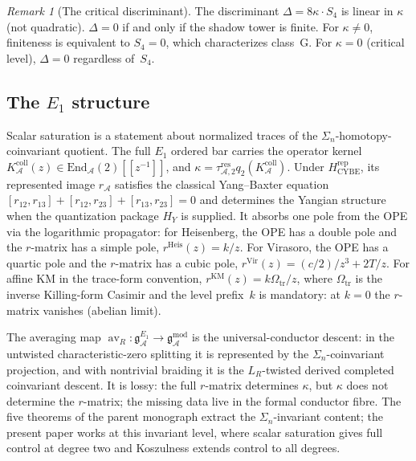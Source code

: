 \documentclass[11pt,reqno]{amsart}
\theoremstyle{definition}
\theoremstyle{remark}
\newtheorem{remark}[theorem]{Remark}
\newcommand{\cA}{\mathcal{A}}
\newcommand{\fg}{\mathfrak{g}}
\newcommand{\Vir}{\mathrm{Vir}}
\newcommand{\KM}{\mathrm{KM}}
\newcommand{\Heis}{\mathrm{Heis}}
\newcommand{\Eone}{E_1}
\DeclareMathOperator{\av}{av}
\numberwithin{equation}{section}
\begin{document}
\begin{remark}[The critical discriminant]
\label{rem:kfc-discriminant}
The discriminant $\Delta = 8\kappa \cdot S_4$ is linear in
$\kappa$ (not quadratic). $\Delta = 0$ if and only if the shadow
tower is finite. For $\kappa \neq 0$, finiteness is equivalent to
$S_4 = 0$, which characterizes class~G. For $\kappa = 0$ (critical
level), $\Delta = 0$ regardless of~$S_4$.
\end{remark}

\subsection{The $\Eone$ structure}

Scalar saturation is a statement about normalized traces of the
$\Sigma_n$-homotopy-coinvariant quotient. The full $\Eone$ ordered
bar carries the operator kernel
$K_\cA^{\mathrm{coll}}(z)\in\mathrm{End}_\cA(2)[\![z^{-1}]\!]$,
and $\kappa=\tau_{\cA,2}^{\mathrm{res}}
q_2(K_\cA^{\mathrm{coll}})$. Under
$H_{\mathrm{CYBE}}^{\mathrm{rep}}$, its represented image $r_\cA$
satisfies the classical Yang--Baxter equation
$[r_{12}, r_{13}] + [r_{12}, r_{23}] + [r_{13}, r_{23}] = 0$
and determines the Yangian structure when the quantization package
$H_Y$ is supplied.
It absorbs one pole from the OPE via the logarithmic propagator:
for Heisenberg, the OPE has a double pole and the $r$-matrix
has a simple pole, $r^{\Heis}(z) = k/z$. For Virasoro, the OPE has
a quartic pole and the $r$-matrix has a cubic pole,
$r^{\Vir}(z) = (c/2)/z^3 + 2T/z$.
For affine KM in the trace-form convention,
$r^{\KM}(z) = k\Omega_{\mathrm{tr}}/z$, where
$\Omega_{\mathrm{tr}}$ is the inverse Killing-form Casimir and the
level prefix~$k$ is mandatory: at $k = 0$
the $r$-matrix vanishes (abelian limit).

The averaging map $\av_R \colon \fg_\cA^{\Eone} \to
\fg_\cA^{\mathrm{mod}}$ is the universal-conductor descent: in the
untwisted characteristic-zero splitting it is represented by the
$\Sigma_n$-coinvariant projection, and with nontrivial braiding it is
the $L_R$-twisted derived completed coinvariant descent. It is lossy:
the full $r$-matrix determines $\kappa$, but $\kappa$ does not
determine the $r$-matrix; the missing data live in the formal
conductor fibre. The five theorems of the parent monograph extract the
$\Sigma_n$-invariant content; the present paper works at this
invariant level, where scalar saturation gives full control at degree
two and Koszulness extends control to all degrees.
\end{document}
